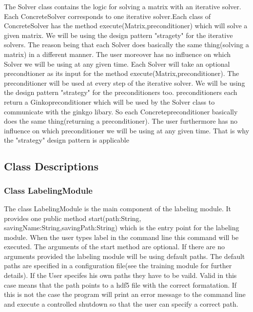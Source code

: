 \documentclass[parskip=full]{scrartcl}
\begin{document}
The Solver class contains the logic for solving a matrix with an \gls{iterative solver}. Each ConcreteSolver corresponds to one \gls{iterative solver}.Each class of ConcreteSolver has the method execute(Matrix,\gls{preconditioner}) which will solve a given matrix. We will be using the design pattern "stragety" for the \gls{iterative solver}s. The reason being that each Solver does basically the same thing(solving a matrix) in a different manner. The user moreover has no influence on which Solver we will be using at any given time.
Each Solver will take an optional precondtioner as its input for the method execute(Matrix,\gls{preconditioner}). The \gls{preconditioner} will be used at every step of the \gls{iterative solver}. We will be using the design pattern "\gls{strategy}" for the \gls{preconditioner}s too. \gls{preconditioner}s each return a Ginko\gls{preconditioner} which will be used by the Solver class to communicate with the ginkgo libary. So each Concrete\gls{preconditioner} basically does the same thing(returning a \gls{preconditioner}). The user furthermore has no influence on which \gls{preconditioner} we will be using at any given time. That is why the "\gls{strategy}" design pattern is applicable

\subsection{Class Descriptions}

\subsubsection{Class LabelingModule}
The class LabelingModule is the main component of the labeling module. It provides one public method start(path:String, savingName:String,savingPath:String) which is the entry point for the labeling module. When the user types label in the command line this command will be executed. The arguments of the start method are optional. If there are no arguments provided the labeling module will be using default paths. The default paths are specified in a configuration file(see the training module for further details). If the User specifes his own paths they have to be vaild. Valid in this case means that the path points to a hdf5 file with the correct formatation. If this is not the case the program will print an error message to the command line and execute a controlled shutdown so that the user can specify a correct path.
\end{document}
